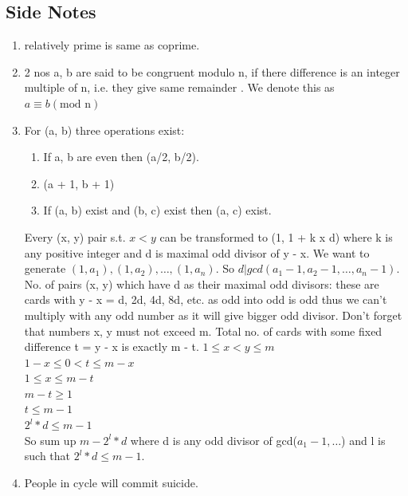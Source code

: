 \documentclass[8pt, a4paper, oneside, twocolumn]{extarticle}
\begin{document}
\subsection{Side Notes}
\begin{enumerate}
    \item relatively prime is same as coprime.
    \item 2 nos a, b are said to be congruent modulo n, if there difference is an integer multiple of n, i.e. they give same remainder . We denote this as $a \equiv b (\text{mod n})$
    \item For (a, b) three operations exist:
    \begin{enumerate}
        \item If a, b are even then (a/2, b/2).
        \item (a + 1, b + 1)
        \item If (a, b) exist and (b, c) exist then (a, c) exist.
    \end{enumerate}
    Every (x, y) pair s.t. $x < y$ can be transformed to (1, 1 + k x d) where k is any positive integer and d is maximal odd divisor of y - x. We want to generate $(1, a_1), (1, a_2), \dots, (1, a_n)$. So $d | gcd(a_1 - 1, a_2 - 1, \dots, a_n - 1)$. No. of pairs (x, y) which have d as their maximal odd divisors: these are cards with y - x = d, 2d, 4d, 8d, etc. as odd into odd is odd thus we can't multiply with any odd number as it will give bigger odd divisor. Don't forget that numbers x, y must not exceed m. Total no. of cards with some fixed difference t = y - x is exactly m - t. $1 \leq x < y \leq m$\\
    $1 - x \leq 0 < t \leq m - x$\\
    $1 \leq x \leq m - t$\\
    $m - t \geq 1$\\
    $t \leq m - 1$
    \\$2^l * d \leq m - 1$\\
    So sum up $m - 2^l * d$ where d is any odd divisor of gcd($a_1 - 1, \dots$) and l is such that $2^l * d \leq m - 1$.
    \item People in cycle will commit suicide.
    

\end{enumerate}
\end{document}
